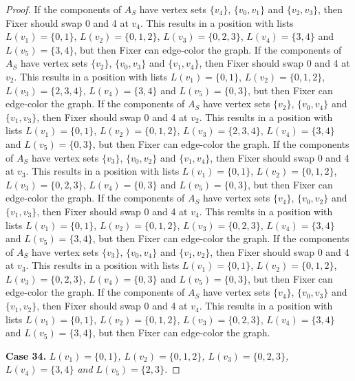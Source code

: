 \documentclass[12pt]{amsart}
\theoremstyle{plain}
\theoremstyle{definition}
\theoremstyle{remark}
\begin{document}
\begin{proof}
If the components of $A_S$ have vertex sets $\{v_4\}$, $\{v_0, v_1\}$ and $\{v_2, v_3\}$, then Fixer should swap 0 and 4 at $v_4$. This results in a position with lists $L(v_1) = \{0, 1\}$, $L(v_2) = \{0, 1, 2\}$, $L(v_3) = \{0, 2, 3\}$, $L(v_4) = \{3, 4\}$ and $L(v_5) = \{3, 4\}$, but then Fixer can edge-color the graph.
If the components of $A_S$ have vertex sets $\{v_2\}$, $\{v_0, v_3\}$ and $\{v_1, v_4\}$, then Fixer should swap 0 and 4 at $v_2$. This results in a position with lists $L(v_1) = \{0, 1\}$, $L(v_2) = \{0, 1, 2\}$, $L(v_3) = \{2, 3, 4\}$, $L(v_4) = \{3, 4\}$ and $L(v_5) = \{0, 3\}$, but then Fixer can edge-color the graph.
If the components of $A_S$ have vertex sets $\{v_2\}$, $\{v_0, v_4\}$ and $\{v_1, v_3\}$, then Fixer should swap 0 and 4 at $v_2$. This results in a position with lists $L(v_1) = \{0, 1\}$, $L(v_2) = \{0, 1, 2\}$, $L(v_3) = \{2, 3, 4\}$, $L(v_4) = \{3, 4\}$ and $L(v_5) = \{0, 3\}$, but then Fixer can edge-color the graph.
If the components of $A_S$ have vertex sets $\{v_3\}$, $\{v_0, v_2\}$ and $\{v_1, v_4\}$, then Fixer should swap 0 and 4 at $v_3$. This results in a position with lists $L(v_1) = \{0, 1\}$, $L(v_2) = \{0, 1, 2\}$, $L(v_3) = \{0, 2, 3\}$, $L(v_4) = \{0, 3\}$ and $L(v_5) = \{0, 3\}$, but then Fixer can edge-color the graph.
If the components of $A_S$ have vertex sets $\{v_4\}$, $\{v_0, v_2\}$ and $\{v_1, v_3\}$, then Fixer should swap 0 and 4 at $v_4$. This results in a position with lists $L(v_1) = \{0, 1\}$, $L(v_2) = \{0, 1, 2\}$, $L(v_3) = \{0, 2, 3\}$, $L(v_4) = \{3, 4\}$ and $L(v_5) = \{3, 4\}$, but then Fixer can edge-color the graph.
If the components of $A_S$ have vertex sets $\{v_3\}$, $\{v_0, v_4\}$ and $\{v_1, v_2\}$, then Fixer should swap 0 and 4 at $v_3$. This results in a position with lists $L(v_1) = \{0, 1\}$, $L(v_2) = \{0, 1, 2\}$, $L(v_3) = \{0, 2, 3\}$, $L(v_4) = \{0, 3\}$ and $L(v_5) = \{0, 3\}$, but then Fixer can edge-color the graph.
If the components of $A_S$ have vertex sets $\{v_4\}$, $\{v_0, v_3\}$ and $\{v_1, v_2\}$, then Fixer should swap 0 and 4 at $v_4$. This results in a position with lists $L(v_1) = \{0, 1\}$, $L(v_2) = \{0, 1, 2\}$, $L(v_3) = \{0, 2, 3\}$, $L(v_4) = \{3, 4\}$ and $L(v_5) = \{3, 4\}$, but then Fixer can edge-color the graph.

\noindent\textbf{Case 34.  }\textit{$L(v_1) = \{0, 1\}$, $L(v_2) = \{0, 1, 2\}$, $L(v_3) = \{0, 2, 3\}$, $L(v_4) = \{3, 4\}$ and $L(v_5) = \{2, 3\}$.}


\end{proof}
\end{document}
